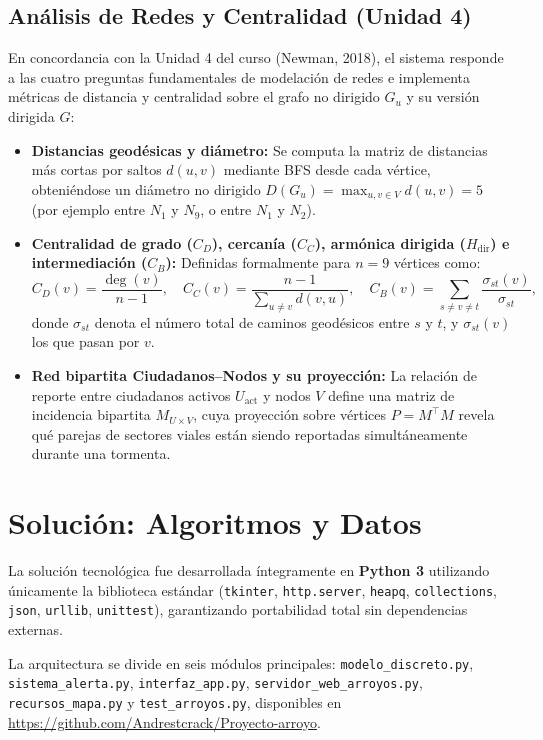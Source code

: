 \documentclass[12pt,letterpaper]{article}
\begin{document}
\subsection{Análisis de Redes y Centralidad (Unidad 4)}

En concordancia con la Unidad 4 del curso (Newman, 2018), el sistema responde a las cuatro preguntas fundamentales de modelación de redes e implementa métricas de distancia y centralidad sobre el grafo no dirigido $G_u$ y su versión dirigida $G$:
\begin{itemize}[leftmargin=2.0cm]
    \item \textbf{Distancias geodésicas y diámetro:} Se computa la matriz de distancias más cortas por saltos $d(u, v)$ mediante BFS desde cada vértice, obteniéndose un diámetro no dirigido $D(G_u) = \max_{u,v \in V} d(u, v) = 5$ (por ejemplo entre $N_1$ y $N_9$, o entre $N_1$ y $N_2$).
    \item \textbf{Centralidad de grado ($C_D$), cercanía ($C_C$), armónica dirigida ($H_{\text{dir}}$) e intermediación ($C_B$):} Definidas formalmente para $n = 9$ vértices como:
    \begin{equation}
        C_D(v) = \frac{\deg(v)}{n - 1}, \quad C_C(v) = \frac{n - 1}{\sum_{u \ne v} d(v, u)}, \quad C_B(v) = \sum_{s \ne v \ne t} \frac{\sigma_{st}(v)}{\sigma_{st}},
    \end{equation}
    donde $\sigma_{st}$ denota el número total de caminos geodésicos entre $s$ y $t$, y $\sigma_{st}(v)$ los que pasan por $v$.
    \item \textbf{Red bipartita Ciudadanos--Nodos y su proyección:} La relación de reporte entre ciudadanos activos $U_{\text{act}}$ y nodos $V$ define una matriz de incidencia bipartita $M_{U \times V}$, cuya proyección sobre vértices $P = M^\top M$ revela qué parejas de sectores viales están siendo reportadas simultáneamente durante una tormenta.
\end{itemize}

\section{Solución: Algoritmos y Datos}

La solución tecnológica fue desarrollada íntegramente en \textbf{Python 3} utilizando únicamente la biblioteca estándar (\texttt{tkinter}, \texttt{http.server}, \texttt{heapq}, \texttt{collections}, \texttt{json}, \texttt{urllib}, \texttt{unittest}), garantizando portabilidad total sin dependencias externas. {\sloppy La arquitectura se divide en seis módulos principales: \texttt{modelo\_discreto.py}, \texttt{sistema\_alerta.py}, \texttt{interfaz\_app.py}, \texttt{servidor\_web\_arroyos.py}, \texttt{recursos\_mapa.py} y \texttt{test\_arroyos.py}, disponibles en \url{https://github.com/Andrestcrack/Proyecto-arroyo}.\par}
\end{document}
